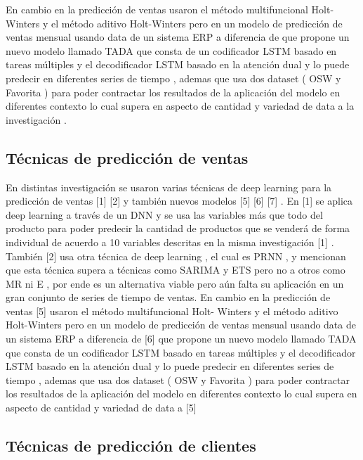 \documentclass[conference]{IEEEtran}
\begin{document}
En cambio en la predicción de ventas \cite{b5} usaron el método multifuncional Holt-Winters y el método aditivo Holt-Winters pero en un modelo 
de predicción de ventas mensual usando data de un sistema ERP a diferencia de  \cite{b6} que propone un nuevo modelo llamado TADA que consta 
de un codificador LSTM basado en tareas múltiples y el decodificador LSTM basado en la atención dual  y lo puede predecir en diferentes series 
de tiempo , ademas que usa dos dataset ( OSW y Favorita ) para poder contractar los resultados de la aplicación del modelo en diferentes 
contexto lo cual supera en aspecto de cantidad y variedad de data a la investigación \cite{b5}.\\

\subsection{Técnicas de predicción de ventas}
En distintas investigación se usaron varias técnicas de deep learning para la
predicción de ventas [1] [2] y también nuevos modelos [5] [6] [7] .
En [1] se aplica deep learning a través de un DNN y se usa las variables más que
todo del producto para poder predecir la cantidad de productos que se venderá de
forma individual de acuerdo a 10 variables descritas en la misma investigación [1] .
También [2] usa otra técnica de deep learning , el cual es PRNN , y mencionan que
esta técnica supera a técnicas como SARIMA y ETS pero no a otros como MR ni E ,
por ende es un alternativa viable pero aún falta su aplicación en un gran conjunto de
series de tiempo de ventas.
En cambio en la predicción de ventas [5] usaron el método multifuncional Holt-
Winters y el método aditivo Holt-Winters pero en un modelo de predicción de ventas
mensual usando data de un sistema ERP a diferencia de [6] que propone un nuevo
modelo llamado TADA que consta de un codificador LSTM basado en tareas
múltiples y el decodificador LSTM basado en la atención dual y lo puede predecir en
diferentes series de tiempo , ademas que usa dos dataset ( OSW y Favorita ) para
poder contractar los resultados de la aplicación del modelo en diferentes contexto lo
cual supera en aspecto de cantidad y variedad de data a [5]

\subsection{Técnicas de predicción de clientes}
\end{document}

